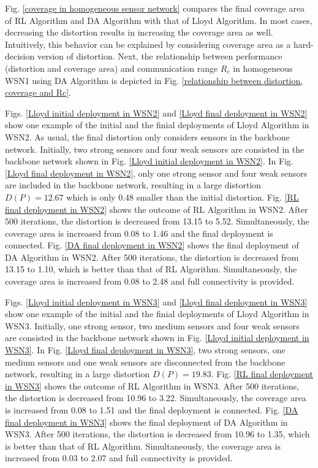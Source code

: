 \documentclass[journal,draftcls,onecolumn,12pt,twoside, narroweqnarray]{IEEEtran}
\begin{document}
Fig. \ref{coverage in homogeneous sensor network} compares the final coverage area of RL Algorithm and DA Algorithm with that of Lloyd Algorithm. In most cases, decreasing the distortion results in increasing the coverage area as well. Intuitively, this behavior can be explained by considering coverage area as a hard-decision version of distortion. Next, the relationship between performance (distortion and coverage area) and communication range $R_c$ in homogeneous WSN1 using DA Algorithm is depicted in Fig. \ref{relationship between distortion, coverage and Rc}.

Figs. \ref{Lloyd initial deployment in WSN2} and \ref{Lloyd final deployment in WSN2} show one example of the initial and the finial deployments of Lloyd Algorithm in WSN2.
As usual, the final distortion only considers sensors in the backbone network.
Initially, two strong sensors and four weak sensors are consisted in the backbone network shown in Fig. \ref{Lloyd initial deployment in WSN2}. In Fig. \ref{Lloyd final deployment in WSN2}, only one strong sensor and four weak sensors are included in the backbone network, resulting in a large distortion $D(P)=12.67$ which is only 0.48 smaller than the initial distortion.
Fig. \ref{RL final deployment in WSN2} shows the outcome of RL Algorithm in WSN2. After 500 iterations, the distortion is decreased from 13.15 to 5.52. Simultaneously, the coverage area is increased from 0.08 to 1.46 and the final deployment is connected.
Fig. \ref{DA final deployment in WSN2} shows the final deployment of DA Algorithm in WSN2. After 500 iterations, the distortion is decreased from 13.15 to 1.10, which is better than that of RL Algorithm. Simultaneously, the coverage area is increased from 0.08 to 2.48 and full connectivity is provided.

Figs. \ref{Lloyd initial deployment in WSN3} and \ref{Lloyd final deployment in WSN3} show one example of the initial and the finial deployments of Lloyd Algorithm in WSN3.
Initially, one strong sensor, two medium sensors and four weak sensors are consisted in the backbone network shown in Fig. \ref{Lloyd initial deployment in WSN3}. In Fig. \ref{Lloyd final deployment in WSN3}, two strong sensors, one medium sensors and one weak sensors are disconnected from the backbone network, resulting in a large distortion $D(P)=19.83$.
Fig. \ref{RL final deployment in WSN3} shows the outcome of RL Algorithm in WSN3. After 500 iterations, the distortion is decreased from 10.96 to 3.22. Simultaneously, the coverage area is increased from 0.08 to 1.51 and the final deployment is connected.
Fig. \ref{DA final deployment in WSN3} shows the final deployment of DA Algorithm in WSN3. After 500 iterations, the distortion is decreased from 10.96 to 1.35, which is better than that of RL Algorithm. Simultaneously, the coverage area is increased from 0.03 to 2.07 and full connectivity is provided.
\end{document}
